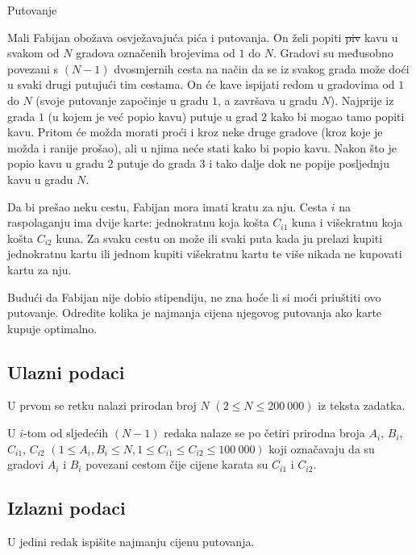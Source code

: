 \begin{statement}[
  problempoints=110,
  timelimit=1 sekunda,
  memorylimit=512 MiB,
]{Putovanje}

Mali Fabijan obožava osvježavajuća pića i putovanja. On želi popiti \sout{piv} kavu u svakom
od $N$ gradova označenih brojevima od $1$ do $N$. Gradovi su međusobno
povezani s $(N - 1)$ dvosmjernih cesta na način da se iz svakog grada može
doći u svaki drugi putujući tim cestama. On će kave ispijati redom u
gradovima od $1$ do $N$ (svoje putovanje započinje u gradu $1$, a završava u
gradu $N$). Najprije iz grada $1$ (u kojem je već popio kavu) putuje u grad
$2$ kako bi mogao tamo popiti kavu. Pritom će možda morati proći i kroz neke
druge gradove (kroz koje je možda i ranije prošao), ali u njima neće stati
kako bi popio kavu.  Nakon što je popio kavu u gradu $2$ putuje do grada $3$
i tako dalje dok ne popije posljednju kavu u gradu $N$.

Da bi prešao neku cestu, Fabijan mora imati kratu za nju. Cesta $i$ na
raspolaganju ima dvije karte: jednokratnu koja košta $C_{i1}$ kuna i
višekratnu koja košta $C_{i2}$ kuna. Za svaku cestu on može ili svaki puta
kada ju prelazi kupiti jednokratnu kartu ili jednom kupiti višekratnu kartu
te više nikada ne kupovati kartu za nju.

Budući da Fabijan nije dobio stipendiju, ne zna hoće li si moći priuštiti ovo
putovanje. Odredite kolika je najmanja cijena njegovog putovanja ako karte
kupuje optimalno.


\subsection*{Ulazni podaci}
U prvom se retku nalazi prirodan broj $N$ $(2 \le N \le 200\ 000)$ iz teksta
zadatka.

U $i$-tom od sljedećih $(N - 1)$ redaka nalaze se po četiri prirodna broja
$A_i$, $B_i$, $C_{i1}$, $C_{i2}$ $(1 \le A_i, B_i \le N, 1 \le C_{i1} \le
C_{i2} \le 100\ 000)$ koji označavaju da su gradovi $A_i$ i $B_i$ povezani
cestom čije cijene karata su   $C_{i1}$ i $C_{i2}$.

\subsection*{Izlazni podaci}
U jedini redak ispišite najmanju cijenu putovanja.


\end{statement}
